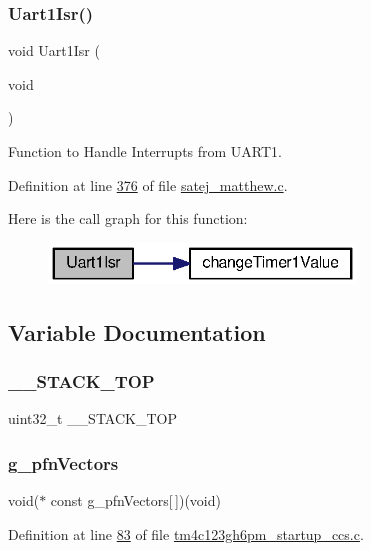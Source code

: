 \subsubsection{\texorpdfstring{Uart1Isr()}{Uart1Isr()}}
{\footnotesize\ttfamily void Uart1\+Isr (\begin{DoxyParamCaption}\item[{void}]{ }\end{DoxyParamCaption})}



Function to Handle Interrupts from U\+A\+R\+T1. 



Definition at line \mbox{\hyperlink{satej__matthew_8c_source_l00376}{376}} of file \mbox{\hyperlink{satej__matthew_8c_source}{satej\+\_\+matthew.\+c}}.

Here is the call graph for this function\+:\nopagebreak
\begin{figure}[H]
\begin{center}
\leavevmode
\includegraphics[width=232pt]{tm4c123gh6pm__startup__ccs_8c_af19c26d9a6dc91ca0e5358bef906f61f_cgraph}
\end{center}
\end{figure}


\subsection{Variable Documentation}
\mbox{\label{tm4c123gh6pm__startup__ccs_8c_ac1f2b7c32de8681c4f4184ca6efca568}} 
\subsubsection{\texorpdfstring{\_\_STACK\_TOP}{\_\_STACK\_TOP}}
{\footnotesize\ttfamily uint32\+\_\+t \+\_\+\+\_\+\+S\+T\+A\+C\+K\+\_\+\+T\+OP}

\mbox{\label{tm4c123gh6pm__startup__ccs_8c_a28c770c8f2522f11e2a95f7486620c5b}} 
\subsubsection{\texorpdfstring{g\_pfnVectors}{g\_pfnVectors}}
{\footnotesize\ttfamily void($\ast$ const g\+\_\+pfn\+Vectors\mbox{[}$\,$\mbox{]})(void)}



Definition at line \mbox{\hyperlink{tm4c123gh6pm__startup__ccs_8c_source_l00083}{83}} of file \mbox{\hyperlink{tm4c123gh6pm__startup__ccs_8c_source}{tm4c123gh6pm\+\_\+startup\+\_\+ccs.\+c}}.

